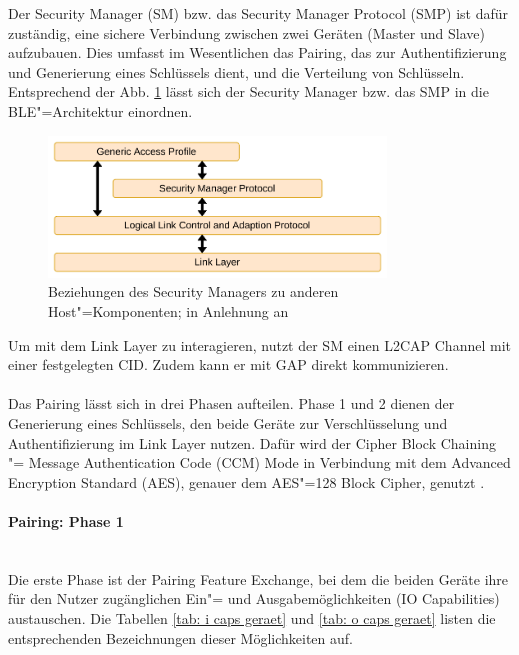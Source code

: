 Der Security Manager (SM) bzw. das Security Manager Protocol (SMP) ist dafür zuständig, eine sichere Verbindung zwischen zwei Geräten (Master und Slave) aufzubauen. Dies umfasst im Wesentlichen das Pairing, das zur Authentifizierung und Generierung eines Schlüssels dient, und die Verteilung von Schlüsseln. Entsprechend der Abb. \ref{fig: smp in bt} lässt sich der Security Manager bzw. das SMP in die BLE"=Architektur einordnen.

\begin{figure}[H]
    \centering
    \includegraphics[width=0.8\textwidth]{graphics/smp_in_bt.pdf}
    \caption[Beziehungen des Security Managers zu anderen Host"=Komponenten]{Beziehungen des Security Managers zu anderen Host"=Komponenten; in Anlehnung an \cite{BtSpec4.0_fig_1958}}
    \label{fig: smp in bt}
\end{figure}

Um mit dem Link Layer zu interagieren, nutzt der SM einen L2CAP Channel mit einer festgelegten CID. Zudem kann er mit GAP direkt kommunizieren.
\\\\
Das Pairing lässt sich in drei Phasen aufteilen. Phase 1 und 2 dienen der Generierung eines Schlüssels, den beide Geräte zur Verschlüsselung und Authentifizierung im Link Layer nutzen. Dafür wird der Cipher Block Chaining "= Message Authentication Code (CCM) Mode in Verbindung mit dem Advanced Encryption Standard (AES), genauer dem AES"=128 Block Cipher, genutzt \cite{BtSpec4.0_2285}.

\paragraph{Pairing: Phase 1} \mbox{} \vspace{0.2cm} \\
Die erste Phase ist der Pairing Feature Exchange, bei dem die beiden Geräte ihre für den Nutzer zugänglichen Ein"= und Ausgabemöglichkeiten (IO Capabilities) austauschen. Die Tabellen \ref{tab: i caps geraet} und \ref{tab: o caps geraet} 
listen die entsprechenden Bezeichnungen dieser Möglichkeiten auf.
\\\\

